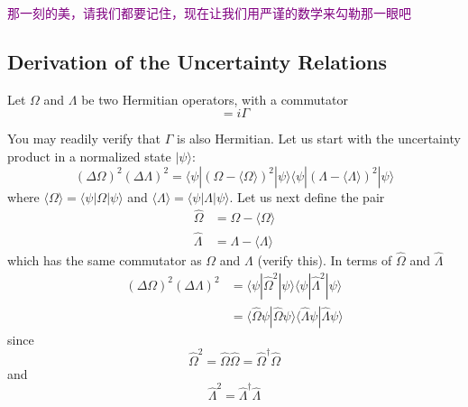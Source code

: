 \begin{center}
	{\large \textcolor{purple}{那一刻的美，请我们都要记住，现在让我们用严谨的数学来勾勒那一眼吧}}
\end{center}

\subsection{ Derivation of the Uncertainty Relations}

Let $\Omega$ and $\Lambda$ be two Hermitian operators, with a commutator
\begin{equation}
	[\Omega, \Lambda] = i\Gamma
\end{equation}

You may readily verify that $\Gamma$ is also Hermitian. Let us start with the uncertainty product in a normalized state $|\psi\rangle$:
\begin{equation}
	(\Delta\Omega)^2(\Delta\Lambda)^2 = \langle\psi|(\Omega - \langle\Omega\rangle)^2|\psi\rangle\langle\psi|(\Lambda - \langle\Lambda\rangle)^2|\psi\rangle
\end{equation}
where $\langle\Omega\rangle = \langle\psi|\Omega|\psi\rangle$ and $\langle\Lambda\rangle = \langle\psi|\Lambda|\psi\rangle$. Let us next define the pair
\begin{equation}
	\begin{aligned}
		\hat{\Omega} &= \Omega - \langle\Omega\rangle \\
		\hat{\Lambda} &= \Lambda - \langle\Lambda\rangle
	\end{aligned}
\end{equation}
which has the same commutator as $\Omega$ and $\Lambda$ (verify this). In terms of $\hat{\Omega}$ and $\hat{\Lambda}$
\begin{equation}
	\begin{aligned}
		(\Delta\Omega)^2(\Delta\Lambda)^2 &= \langle\psi|\hat{\Omega}^2|\psi\rangle\langle\psi|\hat{\Lambda}^2|\psi\rangle \\
		&= \langle\hat{\Omega}\psi|\hat{\Omega}\psi\rangle\langle\hat{\Lambda}\psi|\hat{\Lambda}\psi\rangle
	\end{aligned}
	\label{Eq.9.2.4}
\end{equation}
since
\[
\hat{\Omega}^2 = \hat{\Omega}\hat{\Omega} = \hat{\Omega}^{\dagger}\hat{\Omega}
\]
and
\begin{equation}
	\hat{\Lambda}^2 = \hat{\Lambda}^{\dagger}\hat{\Lambda}
\end{equation}

